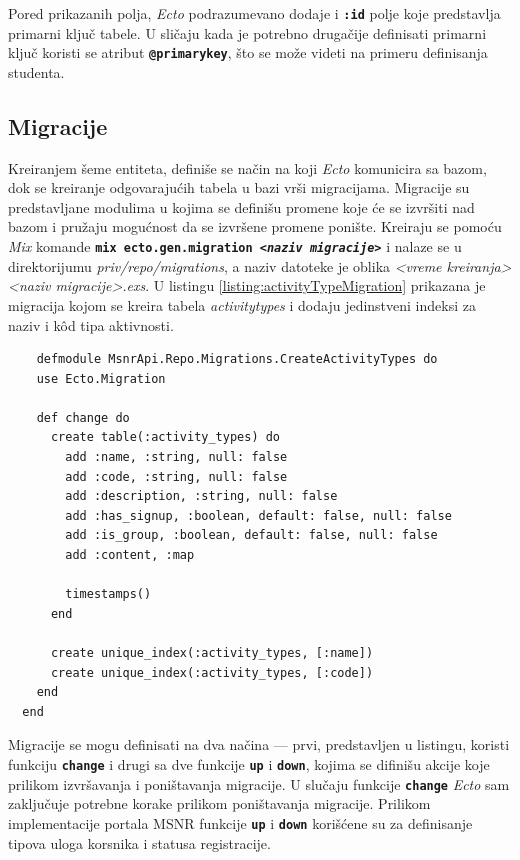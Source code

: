 \documentclass[12pt,oneside]{memoir}
\begin{document}
Pored prikazanih polja, \emph{Ecto} podrazumevano dodaje i \texttt{\textbf{:id}} polje
koje predstavlja primarni ključ tabele. U sličaju kada je potrebno drugačije definisati primarni ključ koristi
se atribut \texttt{\textbf{@primary{\textunderscore}key}}, što se može videti na primeru definisanja studenta.

\subsection{Migracije}
Kreiranjem šeme entiteta, definiše se način na koji \emph{Ecto} komunicira sa bazom, dok se kreiranje odgovarajućih
tabela u bazi vrši migracijama. Migracije su predstavljane modulima u kojima se definišu promene koje će se izvršiti nad
bazom i pružaju mogućnost da se izvršene promene ponište. Kreiraju se pomoću \emph{Mix} komande 
\texttt{\textbf{mix ecto.gen.migration \emph{<naziv migracije>}}} i nalaze se u direktorijumu
\emph{priv/repo/migrations}, a naziv datoteke je oblika \emph{<vreme kreiranja>{\textunderscore}<naziv migracije>.exs}.
U listingu \ref{listing:activityTypeMigration} prikazana je migracija kojom se kreira tabela \emph{activity{\textunderscore}types} i
dodaju jedinstveni indeksi za naziv i k\^{o}d tipa aktivnosti.
\begin{listing}[!h]
  \begin{verbatim}
    defmodule MsnrApi.Repo.Migrations.CreateActivityTypes do
    use Ecto.Migration
  
    def change do
      create table(:activity_types) do
        add :name, :string, null: false
        add :code, :string, null: false
        add :description, :string, null: false
        add :has_signup, :boolean, default: false, null: false
        add :is_group, :boolean, default: false, null: false
        add :content, :map
  
        timestamps()
      end
  
      create unique_index(:activity_types, [:name])
      create unique_index(:activity_types, [:code])
    end
  end
\end{verbatim}
\caption{Migracija za kreiranje tabele \emph{activity{\textunderscore}types}}
\label{listing:activityTypeMigration}
\end{listing}

Migracije se mogu definisati na dva načina --- prvi, predstavljen u listingu, koristi funkciju \texttt{\textbf{change}}
i drugi sa dve funkcije \texttt{\textbf{up}} i \texttt{\textbf{down}}, kojima se difinišu akcije koje prilikom izvršavanja i
poništavanja migracije. U slučaju funkcije \texttt{\textbf{change}} \emph{Ecto} sam zaključuje potrebne korake prilikom
poništavanja migracije. Prilikom implementacije portala MSNR funkcije \texttt{\textbf{up}} i \texttt{\textbf{down}} korišćene
su za definisanje tipova uloga korsnika i statusa registracije.
\end{document}
